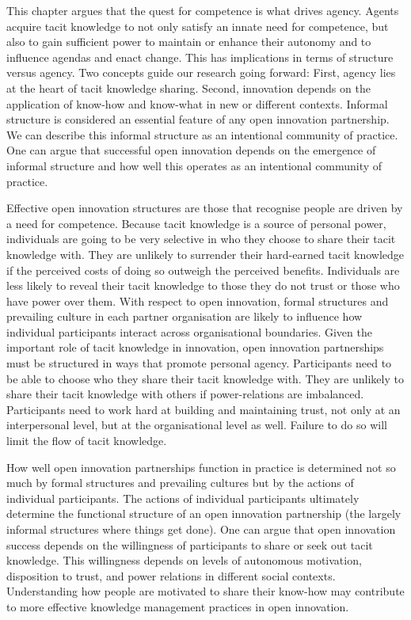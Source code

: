 This chapter argues that the quest for competence is what drives agency. Agents acquire tacit knowledge to not only satisfy an innate need for competence, but also to gain sufficient power to maintain or enhance their autonomy and to influence agendas and enact change. This has implications in terms of structure versus agency. Two concepts guide our research going forward: First, agency lies at the heart of tacit knowledge sharing. Second, innovation depends on the application of know-how and know-what in new or different contexts. Informal structure is considered an essential feature of any open innovation partnership. We can describe this informal structure as an intentional community of practice. One can argue that successful open innovation depends on the emergence of informal structure and how well this operates as an intentional community of practice. \medskip

Effective open innovation structures are those that recognise people are driven by a need for competence. Because tacit knowledge is a source of personal power, individuals are going to be very selective in who they choose to share their tacit knowledge with. They are unlikely to surrender their hard-earned tacit knowledge if the perceived costs of doing so outweigh the perceived benefits. Individuals are less likely to reveal their tacit knowledge to those they do not trust or those who have power over them. With respect to open innovation, formal structures and prevailing culture in each partner organisation are likely to influence how individual participants interact across organisational boundaries. Given the important role of tacit knowledge in innovation, open innovation partnerships must be structured in ways that promote personal agency. Participants need to be able to choose who they share their tacit knowledge with. They are unlikely to share their tacit knowledge with others if power-relations are imbalanced. Participants need to work hard at building and maintaining trust, not only at an interpersonal level, but at the organisational level as well. Failure to do so will limit the flow of tacit knowledge. \medskip

How well open innovation partnerships function in practice is determined not so much by formal structures and prevailing cultures but by the actions of individual participants. The actions of individual participants ultimately determine the functional structure of an open innovation partnership (the largely informal structures where things get done). One can argue that open innovation success depends on the willingness of participants to share or seek out tacit knowledge. This willingness depends on levels of autonomous motivation, disposition to trust, and power relations in different social contexts. Understanding how people are motivated to share their know-how may contribute to more effective knowledge management practices in open innovation. \medskip

